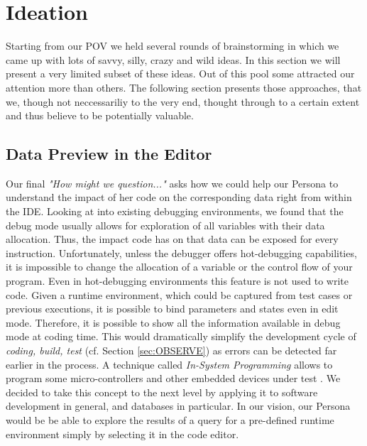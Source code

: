 
\section[Ideation (Author: Felix Leupold)]{Ideation}
\label{sec:IDEATION}

Starting from our POV we held several rounds of brainstorming in which we came up with lots of savvy, silly, crazy and wild ideas. In this section we will present a very limited subset of these ideas. Out of this pool some attracted our attention more than others. The following section presents those approaches, that we, though not neccessariliy to the very end, thought through to a certain extent and thus believe to be potentially valuable.

\subsection{Data Preview in the Editor}
Our final \emph{"How might we question..."} asks how we could help our Persona to understand the impact of her code on the corresponding data right from within the IDE. Looking at into existing debugging environments, we found that the debug mode usually allows for exploration of all variables with their data allocation. Thus, the impact code has on that data can be exposed for every instruction. Unfortunately, unless the debugger offers hot-debugging capabilities, it is impossible to change the allocation of a variable or the control flow of your program. Even in hot-debugging environments this feature is not used to write code.
Given a runtime environment, which could be captured from test cases or previous executions, it is possible to bind parameters and states even in edit mode. Therefore, it is possible to show all the information available in debug mode at coding time. This would dramatically simplify the development cycle of \textit{coding, build, test} (cf. Section \ref{sec:OBSERVE}) as errors can be detected far earlier in the process. A technique called \emph{In-System Programming} allows to program some micro-controllers and other embedded devices under test \cite{herrmann2002apparatus}.
We decided to take this concept to the next level by applying it to software development in general, and databases in particular.  In our vision, our Persona would be be able to explore the results of a query for a pre-defined runtime environment simply by selecting it in the code editor.

